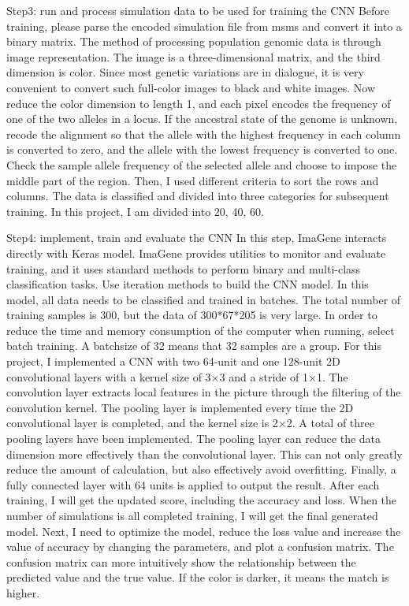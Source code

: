 \documentclass[11pt,a4 paper,title page]{article}
\begin{document}
  Step3: run and process simulation data to be used for training the CNN
Before training, please parse the encoded simulation file from msms and convert it into a binary matrix. The method of processing population genomic data is through image representation. The image is a three-dimensional matrix, and the third dimension is color. Since most genetic variations are in dialogue, it is very convenient to convert such full-color images to black and white images. Now reduce the color dimension to length 1, and each pixel encodes the frequency of one of the two alleles in a locus. If the ancestral state of the genome is unknown, recode the alignment so that the allele with the highest frequency in each column is converted to zero, and the allele with the lowest frequency is converted to one. Check the sample allele frequency of the selected allele and choose to impose the middle part of the region. Then, I used different criteria to sort the rows and columns. The data is classified and divided into three categories for subsequent training. In this project, I am divided into 20, 40, 60.
  \hfill\break
  
  Step4: implement, train and evaluate the CNN
In this step, ImaGene interacts directly with Keras \cite{ gulli2017deep} model. ImaGene provides utilities to monitor and evaluate training, and it uses standard methods to perform binary and multi-class classification tasks. Use iteration methods to build the CNN model. In this model, all data needs to be classified and trained in batches. The total number of training samples is 300, but the data of 300*67*205 is very large. In order to reduce the time and memory consumption of the computer when running, select batch training. A batchsize of 32 means that 32 samples are a group.  For this project, I implemented a CNN with two 64-unit and one 128-unit 2D convolutional layers with a kernel size of 3×3 and a stride of 1×1. The convolution layer extracts local features in the picture through the filtering of the convolution kernel. The pooling layer is implemented every time the 2D convolutional layer is completed, and the kernel size is 2×2. A total of three pooling layers have been implemented. The pooling layer can reduce the data dimension more effectively than the convolutional layer. This can not only greatly reduce the amount of calculation, but also effectively avoid overfitting. Finally, a fully connected layer with 64 units is applied to output the result. After each training, I will get the updated score, including the accuracy and loss. When the number of simulations is all completed training, I will get the final generated model. Next, I need to optimize the model, reduce the loss value and increase the value of accuracy by changing the parameters, and plot a confusion matrix. The confusion matrix can more intuitively show the relationship between the predicted value and the true value. If the color is darker, it means the match is higher.
  \hfill\break
  
\end{document}
